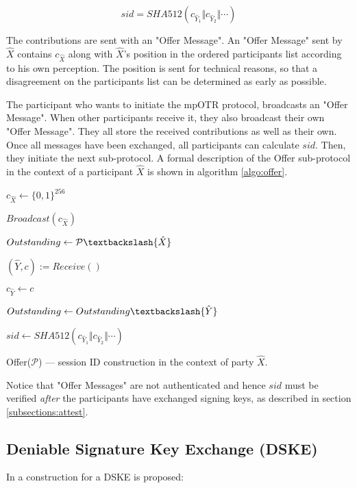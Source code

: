 \[
  sid = SHA512(c_{\hat{Y}_1} \Vert c_{\hat{Y}_2} \Vert \cdots)
\]

The contributions are sent with an "Offer Message". An "Offer Message" sent by $\hat{X}$ contains $c_{\hat{X}}$ along with $\hat{X}$'s position in the ordered participants list according to his own perception. The position is sent for technical reasons, so that a disagreement on the participants list can be determined as early as possible.

The participant who wants to initiate the mpOTR protocol, broadcasts an "Offer Message". When other participants receive it, they also broadcast their own "Offer Message". They all store the received contributions as well as their own. Once all messages have been exchanged, all participants can calculate $sid$. Then, they initiate the next sub-protocol. A formal description of the Offer sub-protocol in the context of a participant $\hat{X}$ is shown in algorithm \ref{algo:offer}.

\begin{algorithm}[H]
  \Begin
  {
	$c_{\hat{X}} \leftarrow \{0,1\}^{256}$
	
	$Broadcast(c_{\hat{X}})$
	
	$Outstanding \leftarrow \mathcal{P} \textbackslash \{\hat{X}\}$

    {    
      $(\hat{Y}, c) := Receive()$
      
      {      
        $c_{\hat{Y}} \leftarrow c$
      
        $Outstanding \leftarrow Outstanding \textbackslash \{\hat{Y}\}$
      }
    }
   
    $sid \leftarrow SHA512(c_{\hat{Y}_1} \Vert c_{\hat{Y}_2} \Vert \cdots)$


  }
  \caption{Offer($\mathcal{P}$) --- session ID construction in the context of party $\hat{X}$.}
  \label{algo:offer}
\end{algorithm}

Notice that "Offer Messages" are not authenticated and hence $sid$ must be verified \emph{after} the participants have exchanged signing keys, as described in section \ref{subsections:attest}.


\subsection{Deniable Signature Key Exchange (DSKE)}
\label{subsections:DSKE}
In \cite{mpotr} a construction for a DSKE is proposed:

